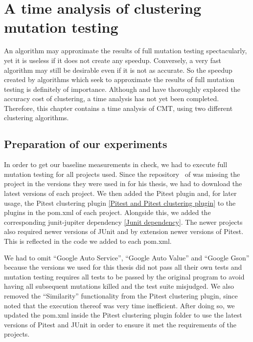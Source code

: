 \documentclass[twoside]{uva-inf-bachelor-thesis}
\begin{document}
\chapter{A time analysis of clustering mutation testing}
\label{chap:3}
An algorithm may approximate the results of full mutation testing spectacularly, yet it is useless if it does not create any speedup. Conversely, a very fast algorithm may still be desirable even if it is not as accurate. So the speedup created by algorithms which seek to approximate the results of full mutation testing is definitely of importance. Although \textcite{Basarat21} and \textcite{Mouissie22} have thoroughly explored the accuracy cost of clustering, a time analysis has not yet been completed. Therefore, this chapter contains a time analysis of CMT, using two different clustering algorithms.

\section{Preparation of our experiments}
In order to get our baseline measurements in check, we had to execute full mutation testing for all projects used. Since the repository~\cite{rbasarat-repo} of \textcite{Basarat21} was missing the project in the versions they were used in for his thesis, we had to download the latest versions of each project. We then added the Pitest plugin and, for later usage, the Pitest clustering plugin \ref{Pitest and Pitest clustering plugin} to the plugins in the pom.xml of each project. Alongside this, we added the corresponding junit-jupiter dependency \ref{Junit dependency}. The newer projects also required newer versions of JUnit and by extension newer versions of Pitest. This is reflected in the code we added to each pom.xml.


We had to omit ``Google Auto Service'', ``Google Auto Value'' and ``Google Gson'' because the versions we used for this thesis did not pass all their own tests and mutation testing requires all tests to be passed by the original program to avoid having all subsequent mutations killed and the test suite misjudged. We also removed the ``Similarity'' functionality from the Pitest clustering plugin, since \textcite{Basarat21} noted that the execution thereof was very time inefficient. After doing so, we updated the pom.xml inside the Pitest clustering plugin folder to use the latest versions of Pitest and JUnit in order to ensure it met the requirements of the projects.~\cite{aAbdalla-repo}
\end{document}
